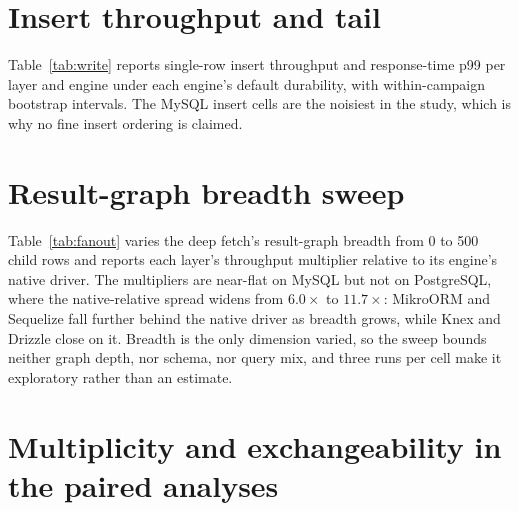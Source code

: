 \documentclass[11pt,a4paper]{article}
\newcommand{\tabledir}{tables/}
\begin{document}
\section{Insert throughput and tail}
\label{sup:insert}
Table~\ref{tab:write} reports single-row insert throughput and response-time p99 per layer and
engine under each engine's default durability, with within-campaign bootstrap intervals. The
MySQL insert cells are the noisiest in the study, which is why no fine insert ordering is claimed.



\section{Result-graph breadth sweep}
\label{sup:fanout}
Table~\ref{tab:fanout} varies the deep fetch's result-graph breadth from 0 to 500 child rows and
reports each layer's throughput multiplier relative to its engine's native driver. The multipliers
are near-flat on MySQL but not on PostgreSQL, where the native-relative spread widens from
$6.0\times$ to $11.7\times$: MikroORM and Sequelize fall further behind the native driver as
breadth grows, while Knex and Drizzle close on it. Breadth is the only dimension varied, so the
sweep bounds neither graph depth, nor schema, nor query mix, and three runs per cell make it
exploratory rather than an estimate.



\section{Multiplicity and exchangeability in the paired analyses}
\label{sup:multiplicity}
\end{document}

